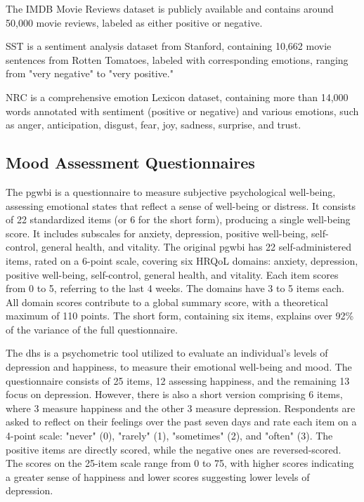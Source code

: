 \documentclass[a4paper,fleqn]{cas-sc}
\begin{document}
The IMDB Movie Reviews dataset \cite{IMDB} is publicly available and contains around 50,000 movie reviews, labeled as either positive or negative.

SST \cite{SST} is a sentiment analysis dataset from Stanford, containing 10,662 movie sentences from Rotten Tomatoes, labeled with corresponding emotions, ranging from "very negative" to "very positive."

NRC \cite{SaifmohammadLexicons} is a comprehensive emotion Lexicon dataset, containing more than 14,000 words annotated with sentiment (positive or negative) and various emotions, such as anger, anticipation, disgust, fear, joy, sadness, surprise, and trust.

\subsection{Mood Assessment Questionnaires}


The \gls{pgwbi} \cite{grossi_psychological_2014} is a questionnaire to measure subjective psychological well-being, assessing emotional states that reflect a sense of well-being or distress. It consists of 22 standardized items (or 6 for the short form), producing a single well-being score. It includes subscales for anxiety, depression, positive well-being, self-control, general health, and vitality. The original \gls{pgwbi} has 22 self-administered items, rated on a 6-point scale, covering six HRQoL domains: anxiety, depression, positive well-being, self-control, general health, and vitality. Each item scores from 0 to 5, referring to the last 4 weeks. The domains have 3 to 5 items each. All domain scores contribute to a global summary score, with a theoretical maximum of 110 points. The short form, containing six items, explains over 92\% of the variance of the full questionnaire.

The \gls{dhs} \cite{mcgreal_depression_happiness_1993, joseph_rapid_SDHS} is a psychometric tool utilized to evaluate an individual's levels of depression and happiness, to measure their emotional well-being and mood. The questionnaire consists of 25 items, 12 assessing happiness, and the remaining 13 focus on depression. However, there is also a short version comprising 6 items, where 3 measure happiness and the other 3 measure depression. Respondents are asked to reflect on their feelings over the past seven days and rate each item on a 4-point scale: "never" (0), "rarely" (1), "sometimes" (2), and "often" (3). The positive items are directly scored, while the negative ones are reversed-scored. The scores on the 25-item scale range from 0 to 75, with higher scores indicating a greater sense of happiness and lower scores suggesting lower levels of depression. 
\end{document}
